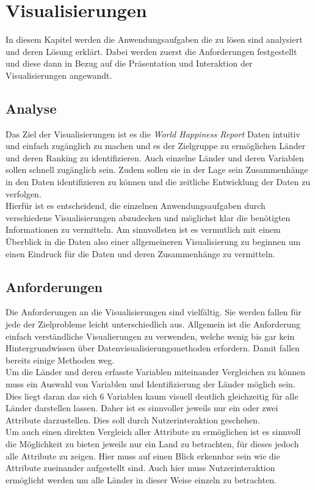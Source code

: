 \section{Visualisierungen}
In diesem Kapitel werden die Anwendungsaufgaben die zu lösen sind analysiert und deren Lösung erklärt. Dabei werden zuerst die Anforderungen festgestellt und diese dann in Bezug auf die Präsentation und Interaktion der Visualisierungen angewandt.  

\subsection{Analyse}

Das Ziel der Visualisierungen ist es die \textit{World Happiness Report} Daten intuitiv und einfach zugänglich zu machen und es der Zielgruppe zu ermöglichen Länder und deren Ranking zu identifizieren. Auch einzelne Länder und deren Variablen sollen schnell zugänglich sein. Zudem sollen sie in der Lage sein Zusammenhänge in den Daten identifizieren zu können und die zeitliche Entwicklung der Daten zu verfolgen. \\

Hierfür ist es entscheidend, die einzelnen Anwendungsaufgaben durch verschiedene Visualisierungen abzudecken und möglichst klar die benötigten Informationen zu vermitteln. 
Am sinnvollsten ist es vermutlich mit einem Überblick in die Daten also einer allgemeineren Visualisierung zu beginnen um einen Eindruck für die Daten und deren Zusammenhänge zu vermitteln. \\

\subsection{Anforderungen}
Die Anforderungen an die Visualisierungen sind vielfältig. Sie werden fallen für jede der Zielprobleme leicht unterschiedlich aus. Allgemein ist die Anforderung einfach verständliche Visualierungen zu verwenden, welche wenig bis gar kein Hintergrundwissen über Datenvisualisierungsmethoden erfordern. Damit fallen bereits einige Methoden weg. \\

Um die Länder und deren erfasste Variablen miteinander Vergleichen zu können muss ein Auswahl von Variablen und Identifizierung der Länder möglich sein. Dies liegt daran das sich 6 Variablen kaum visuell deutlich gleichzeitig für alle Länder darstellen lassen. Daher ist es sinnvoller jeweils nur ein oder zwei Attribute darzustellen. Dies soll durch Nutzerinteraktion geschehen. \\

Um auch einen direkten Vergleich aller Attribute zu ermöglichen ist es sinnvoll die Möglichkeit zu bieten jeweils nur ein Land zu betrachten, für dieses jedoch alle Attribute zu zeigen. Hier muss auf einen Blick erkennbar sein wie die Attribute zueinander aufgestellt sind. Auch hier muss Nutzerinteraktion ermöglicht werden um alle Länder in dieser Weise einzeln zu betrachten. \\

